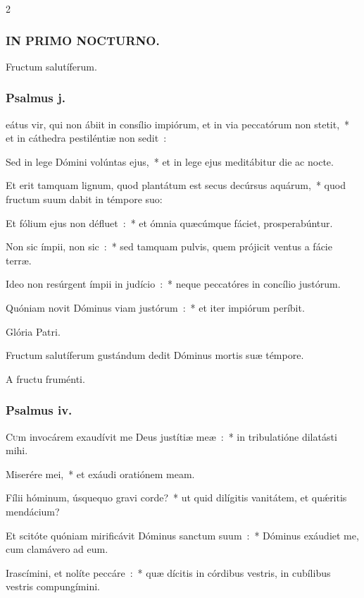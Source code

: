 \documentclass[9pt,twoside]{extarticle}
\begin{document}
\begin{multicols}{2}
\subsubsection*{\center \textsc{IN PRIMO NOCTURNO.}}
 Fructum salutíferum.
\subsubsection*{\center Psalmus j.}
eátus vir, qui non ábiit in consílio impiórum, et in via peccatórum non stetit,~* et in cáthedra pestiléntiæ non sedit~:

Sed in lege Dómini volúntas ejus,~* et in lege ejus meditábitur die ac nocte.

Et erit tamquam lignum, quod plantátum est secus decúrsus aquárum,~* quod fructum suum dabit in témpore suo:

Et fólium ejus non défluet~:~* et ómnia quæcúmque fáciet, prosperabúntur.

Non sic ímpii, non sic~:~* sed tamquam pulvis, quem prójicit ventus a fácie terræ.

Ideo non resúrgent ímpii in judício~:~* neque peccatóres in concílio justórum.

Quóniam novit Dóminus viam justórum~:~* et iter impiórum períbit.

Glória Patri.

\begin{tightlist}{}
\item {} Fructum salutíferum gustándum dedit Dóminus mortis suæ témpore.
\item {} A fructu fruménti.
\end{tightlist}

\subsubsection*{\center Psalmus iv.}
\lettrine{C}um invocárem exaudívit me Deus justítiæ meæ~:~* in tribulatióne dilatásti mihi.

Miserére mei,~* et exáudi oratiónem meam.

Fílii hóminum, úsquequo gravi corde?~* ut quid dilígitis vanitátem, et quǽritis mendácium?

Et scitóte quóniam mirificávit Dóminus sanctum suum~:~* Dóminus exáudiet me, cum clamávero ad eum.

Irascímini, et nolíte peccáre~:~* quæ dícitis in córdibus vestris, in cubílibus vestris compungímini.


\end{multicols}
\end{document}
